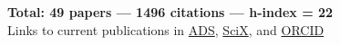 \documentclass[11pt]{article}
\newcommand{\totalcitations}{{\bf Total: 49 papers --- 1496 citations --- h-index = 22}}
\newcommand{\adspublink}{\href{https://ui.adsabs.harvard.edu/public-libraries/y09ZmJBWTfCs0q5KMVKSwQ}{ADS}}
\newcommand{\scixpublink}{\href{https://scixplorer.org/public-libraries/y09ZmJBWTfCs0q5KMVKSwQ}{SciX}}
\newcommand{\orcidlink}{\href{https://orcid.org/my-orcid?orcid=0000-0003-2508-2586}{ORCID}}
\begin{document}
\totalcitations\\
Links to current publications in \adspublink, \scixpublink, and \orcidlink

\begingroup
\let\clearpage\relax

\renewcommand{\bibsection}{}
{}

\nocite{*}
\endgroup

\end{document}
